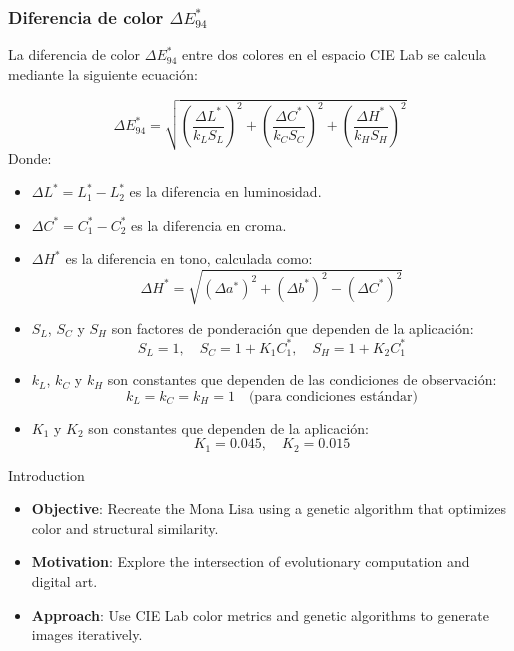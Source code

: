 \begin{frame}
    \frametitle{Diferencia de color \(\Delta E_{94}^*\)}



    La diferencia de color \(\Delta E_{94}^*\) entre dos colores en el espacio CIE Lab se calcula mediante la siguiente ecuación:

    \[
        \Delta E_{94}^* = \sqrt{
            \left( \frac{\Delta L^*}{k_L S_L} \right)^2 +
            \left( \frac{\Delta C^*}{k_C S_C} \right)^2 +
            \left( \frac{\Delta H^*}{k_H S_H} \right)^2
        }
    \]
    \scriptsize
    Donde:
    \begin{itemize}
        \item \(\Delta L^* = L_1^* - L_2^*\) es la diferencia en luminosidad.
        \item \(\Delta C^* = C_1^* - C_2^*\) es la diferencia en croma.
        \item \(\Delta H^*\) es la diferencia en tono, calculada como:
              \[
                  \Delta H^* = \sqrt{ (\Delta a^*)^2 + (\Delta b^*)^2 - (\Delta C^*)^2 }
              \]
        \item \(S_L\), \(S_C\) y \(S_H\) son factores de ponderación que dependen de la aplicación:
              \[
                  S_L = 1, \quad S_C = 1 + K_1 C_1^*, \quad S_H = 1 + K_2 C_1^*
              \]
        \item \(k_L\), \(k_C\) y \(k_H\) son constantes que dependen de las condiciones de observación:
              \[
                  k_L = k_C = k_H = 1 \quad \text{(para condiciones estándar)}
              \]
        \item \(K_1\) y \(K_2\) son constantes que dependen de la aplicación:
              \[
                  K_1 = 0.045, \quad K_2 = 0.015
              \]
    \end{itemize}


\end{frame}





\begin{frame}{Introduction}
    \begin{itemize}
        \item \textbf{Objective}: Recreate the Mona Lisa using a genetic algorithm that optimizes color and structural similarity.
        \item \textbf{Motivation}: Explore the intersection of evolutionary computation and digital art.
        \item \textbf{Approach}: Use CIE Lab color metrics and genetic algorithms to generate images iteratively.
    \end{itemize}
\end{frame}

